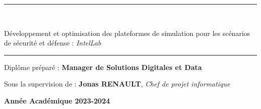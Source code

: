 \documentclass[a4paper, oneside, 12pt, final]{extreport}
\newcommand{\reportSubject} {
  Développement et optimisation des plateformes de simulation pour les scénarios de sécurité et défense : \textit{IntelLab} 
}
\newcommand{\AU} {
\centering \textbf{Année Académique 2023-2024}
}
\begin{document}
\begin{titlepage}
\begin{center}
    {
      \renewcommand*{\familydefault}{\defaultFont}
      \fontsize{27pt}{27pt}\selectfont%
      \rule{0.5\textwidth}{.4pt}\\
      \vspace{10pt}
      \reportSubject{}\\%
      \vspace{10pt}
      \rule{0.5\textwidth}{.4pt}
    }

    \vspace{30pt}
    {Diplôme préparé : \textbf{\large Manager de Solutions Digitales et Data}}\\
    \vspace{46pt}

    Sous la supervision de :  \textbf{Jonas RENAULT}, \textit{Chef de projet informatique}\\
    \vspace{50pt}

  \end{center}
  \vspace{30pt}
  \AU\\
\end{titlepage}

%
\end{document}

